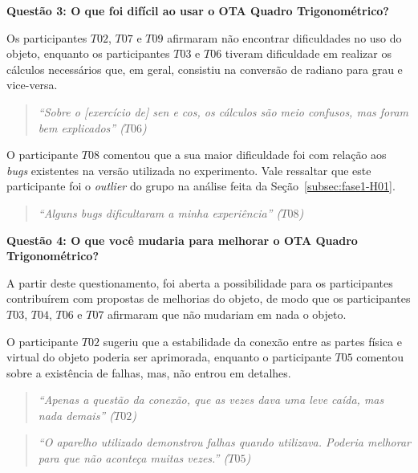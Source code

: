 \textbf{Questão 3: O que foi difícil ao usar o OTA Quadro Trigonométrico?}

Os participantes $T02$, $T07$ e $T09$ afirmaram não encontrar dificuldades no uso do objeto, enquanto os participantes $T03$ e $T06$ tiveram dificuldade em realizar os cálculos necessários que, em geral, consistiu na conversão de radiano para grau e vice-versa.

\begin{quote}
	\textit{``Sobre o [exercício de] sen e cos, os cálculos são meio confusos, mas foram bem explicados'' ($T06$)}
\end{quote}

O participante $T08$ comentou que a sua maior dificuldade foi com relação aos \textit{bugs} existentes na versão utilizada no experimento. Vale ressaltar que este participante foi o \textit{outlier} do grupo na análise feita da Seção~\ref{subsec:fase1-H01}.

\begin{quote}
	\textit{``Alguns bugs dificultaram a minha experiência'' ($T08$)}
\end{quote}



\textbf{Questão 4: O que você mudaria para melhorar o OTA Quadro Trigonométrico?}

A partir deste questionamento, foi aberta a possibilidade para os participantes contribuírem com propostas de melhorias do objeto, de modo que os participantes $T03$, $T04$, $T06$ e $T07$ afirmaram que não mudariam em nada o objeto.

O participante $T02$ sugeriu que a estabilidade da conexão entre as partes física e virtual do objeto poderia ser aprimorada, enquanto o participante $T05$ comentou sobre a existência de falhas, mas, não entrou em detalhes.

\begin{quote}
	\textit{``Apenas a questão da conexão, que as vezes dava uma leve caída, mas nada demais'' ($T02$)}
\end{quote}

\begin{quote}
	\textit{``O aparelho utilizado demonstrou falhas quando utilizava. Poderia melhorar para que não aconteça muitas vezes.'' ($T05$)}
\end{quote}

